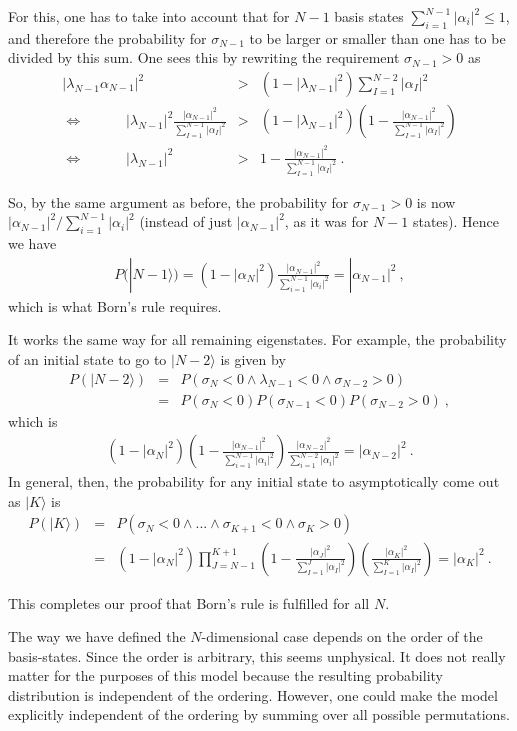 \documentclass[12pt]{article}
\def\beqn{\begin{eqnarray}}
\def\eeqn{\end{eqnarray}}
\begin{document}
For this, one has to take into account that for $N-1$ basis states  $\sum_{i=1}^{N-1} |\alpha_i|^2 \leq 1$, and therefore the probability for $\sigma_{N-1}$ to be larger or smaller than one has to be divided by this sum. One sees this by rewriting the requirement $\sigma_{N-1} > 0$ as
\beqn
|  \lambda_{N-1} \alpha_{N-1} |^2 &>& (1 -  |\lambda_{N-1}|^2)  \sum_{I=1}^{N-2} |\alpha_I|^2  \nonumber\\
\Leftrightarrow \quad \quad \quad |  \lambda_{N-1}|^2 \frac{|\alpha_{N-1} |^2}{\sum_{I=1}^{N-1} |\alpha_I|^2}  &>& (1 -  | \lambda_{N-1}|^2) \left(1- \frac{|\alpha_{N-1}|^2}{\sum_{I=1}^{N-1} |\alpha_I|^2} \right) \nonumber\\
\Leftrightarrow \quad \quad \quad| \lambda_{N-1}|^2 &>& 1- \frac{|\alpha_{N-1}|^2}{\sum_{I=1}^{N-1} |\alpha_I|^2}~. \label{prop2}
\eeqn

So, by the same argument as before, the probability for $\sigma_{N-1} > 0$ is now $|\alpha_{N-1}|^2/\sum_{i=1}^{N-1} |\alpha_i|^2$ (instead of just $|\alpha_{N-1}|^2$, as it was for $N-1$ states). Hence we have
\beqn
P(|N-1 \rangle) = ( 1- |\alpha_{N}|^2)  \frac{ |\alpha_{N-1}|^2}{\sum_{i=1}^{N-1} |\alpha_i|^2} = |\alpha_{N-1}|^2~,
\eeqn
which is what Born's rule requires. 

It works the same way for all remaining eigenstates. For example, the probability of an initial state to go to $|N-2 \rangle$ is given by
\beqn
P(|N-2\rangle) &=& P(\sigma_{N} < 0 \wedge \lambda_{N-1} < 0 \wedge \sigma_{N-2} >0) \nonumber \\
&=&  
P(\sigma_{N} < 0) P(\sigma_{N-1} < 0)P (\sigma_{N-2} >0)~,
\eeqn
 which is
\beqn
( 1- |\alpha_{N}|^2)  \left( 1- \frac{ |\alpha_{N-1}|^2}{\sum_{i=1}^{N-1} |\alpha_i|^2} \right) \frac{ |\alpha_{N-2}|^2}{\sum_{i=1}^{N-2} |\alpha_i|^2} = |\alpha_{N-2}|^2~.
\eeqn
In general, then, the probability for any initial state to asymptotically come out as $|K\rangle$ is 
\beqn
P(| K \rangle)  &=& P(\sigma_{N} < 0 \wedge...\wedge \sigma_{K+1} < 0 \wedge \sigma_{K} >0) \nonumber \\
&=& (1- |\alpha_{N}|^2) \prod_{J=N-1}^{K+1} \left( 1- \frac{ |\alpha_{J}|^2}{\sum_{I=1}^{J} |\alpha_I|^2} \right) \left(\frac{ |\alpha_{K}|^2}{\sum_{I=1}^{K} |\alpha_I|^2}\right) = |\alpha_{K}|^2~.
\eeqn

This completes our proof that Born's rule is fulfilled for all $N$.

The way we have defined the $N$-dimensional case depends on the order of the basis-states. Since the order is arbitrary, this seems unphysical. It does not really matter for the purposes of this model because the resulting probability distribution is independent of the ordering. However, one could make the model explicitly independent of the ordering by summing over all possible permutations. 
\end{document}
